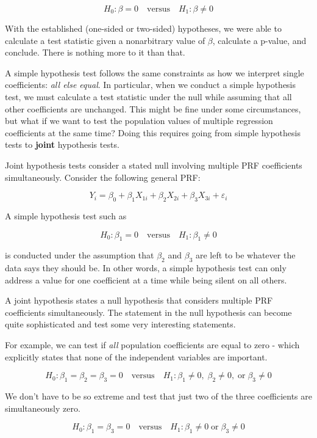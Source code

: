 \documentclass[
]{book}
\begin{document}
\[H_0: \beta = 0 \quad \text{versus} \quad H_1: \beta \neq 0\]

With the established (one-sided or two-sided) hypotheses, we were able to calculate a test statistic given a nonarbitrary value of \(\beta\), calculate a p-value, and conclude. There is nothing more to it than that.

A simple hypothesis test follows the same constraints as how we interpret single coefficients: \emph{all else equal}. In particular, when we conduct a simple hypothesis test, we must calculate a test statistic under the null while assuming that all other coefficients are unchanged. This might be fine under some circumstances, but what if we want to test the population values of multiple regression coefficients at the same time? Doing this requires going from simple hypothesis tests to \textbf{joint} hypothesis tests.

Joint hypothesis tests consider a stated null involving multiple PRF coefficients simultaneously. Consider the following general PRF:

\[Y_i = \beta_0 + \beta_1 X_{1i} + \beta_2 X_{2i} + \beta_3 X_{3i} + \varepsilon_i\]

A simple hypothesis test such as

\[H_0: \beta_1 = 0 \quad \text{versus} \quad H_1: \beta_1 \neq 0\]

is conducted under the assumption that \(\beta_2\) and \(\beta_3\) are left to be whatever the data says they should be. In other words, a simple hypothesis test can only address a value for one coefficient at a time while being silent on all others.

A joint hypothesis states a null hypothesis that considers multiple PRF coefficients simultaneously. The statement in the null hypothesis can become quite sophisticated and test some very interesting statements.

For example, we can test if \emph{all} population coefficients are equal to zero - which explicitly states that none of the independent variables are important.

\[H_0: \beta_1 = \beta_2 = \beta_3 = 0 \quad \text{versus} \quad H_1: \beta_1 \neq 0,\; \beta_2 \neq 0,\; \text{or} \; \beta_3 \neq 0\]

We don't have to be so extreme and test that just two of the three coefficients are simultaneously zero.

\[H_0: \beta_1 = \beta_3 = 0 \quad \text{versus} \quad H_1: \beta_1 \neq 0\; \text{or} \; \beta_3 \neq 0\]
\end{document}
